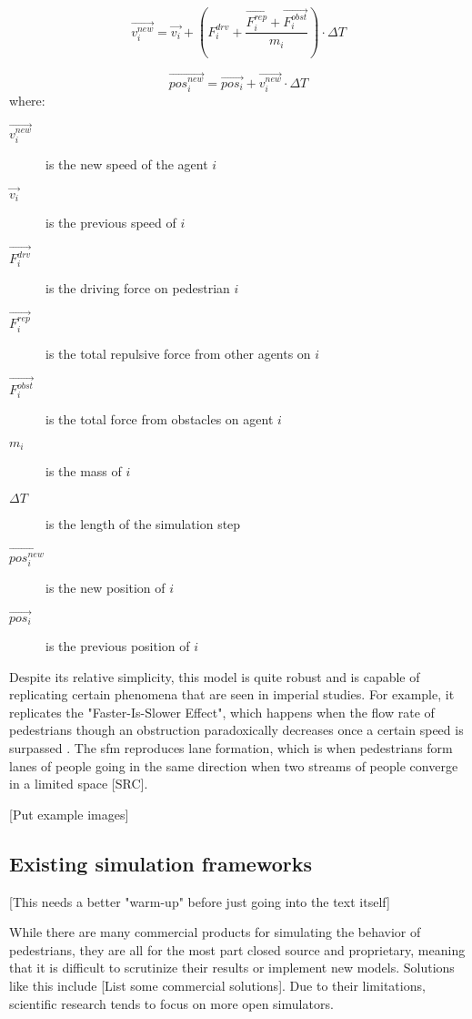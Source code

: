 \documentclass[twoside, 11pt]{article}
\begin{document}
\begin{equation}
  \vec{v_i^{new}} = \vec{v_i} + ( F_i^{drv} + \frac{\vec{F_i^{rep}} + \vec{F_i^{obst}}}{m_i} ) \cdot \Delta T
  \label{eq:pedestrian_final_speed}
\end{equation}

\begin{equation}
  \vec{pos_i^{new}} = \vec{pos_i} + \vec{v_i^{new}} \cdot \Delta T
  \label{eq:pedestrian_final_position}
\end{equation}
where:
\begin{description}
  \item[$\vec{v_i^{new}}$] is the new speed of the agent $i$
  \item[$\vec{v_i}$] is the previous speed of $i$
  \item[$\vec{F_i^{drv}}$] is the driving force on pedestrian $i$
  \item[$\vec{F_i^{rep}}$] is the total repulsive force from other agents on $i$
  \item[$\vec{F_i^{obst}}$] is the total force from obstacles on agent $i$
  \item[$m_i$] is the mass of $i$ 
  \item[$\Delta T$] is the length of the simulation step
  \item[$\vec{pos_i^{new}}$] is the new position of $i$
  \item[$\vec{pos_i}$] is the previous position of $i$
\end{description}

Despite its relative simplicity, this model is quite robust and is capable of replicating certain phenomena that are seen in imperial studies. For example, it replicates the "Faster-Is-Slower Effect", which happens when the flow rate of pedestrians though an obstruction paradoxically decreases once a certain speed is surpassed \cite{helbingSimulatingDynamicFeatures2000}. The \gls{sfm} reproduces lane formation, which is when pedestrians form lanes of people going in the same direction when two streams of people converge in a limited space [SRC].

[Put example images]

\subsection{Existing simulation frameworks}

[This needs a better "warm-up" before just going into the text itself]

While there are many commercial products for simulating the behavior of pedestrians, they are all for the most part closed source and proprietary, meaning that it is difficult to scrutinize their results or implement new models. Solutions like this include [List some commercial solutions]. Due to their limitations, scientific research tends to focus on more open simulators. 
\end{document}
